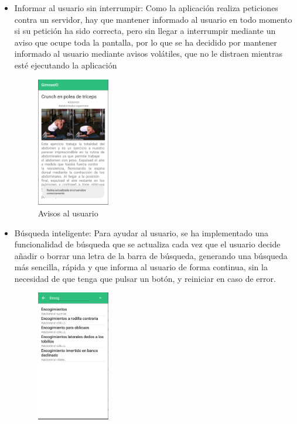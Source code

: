 \documentclass[11pt,a4paper]{report}
\begin{document}
\begin{itemize}
	\item Informar al usuario sin interrumpir: Como la aplicación realiza peticiones contra un servidor, hay que mantener informado al usuario en todo momento si su petición ha sido correcta, pero sin llegar a interrumpir mediante un aviso que ocupe toda la pantalla, por lo que se ha decidido por mantener informado al usuario mediante avisos volátiles, que no le distraen mientras esté ejecutando la aplicación
\begin{figure}[H]
		\centering
		\includegraphics[width=0.3\textwidth]{graficos/Usabilidad/toast.png}
		\caption{Avisos al usuario}
	\end{figure}
	\item Búsqueda inteligente: Para ayudar al usuario, se ha implementado una funcionalidad de búsqueda que se actualiza cada vez que el usuario decide añadir o borrar una letra de la barra de búsqueda, generando una búsqueda más sencilla, rápida y que informa al usuario de forma continua, sin la necesidad de que tenga que pulsar un botón, y reiniciar en caso de error.
	\begin{figure}[H]
		\centering
		\includegraphics[width=0.3\textwidth]{graficos/Usabilidad/busqueda.png}

\end{figure}
\end{itemize}
\end{document}
